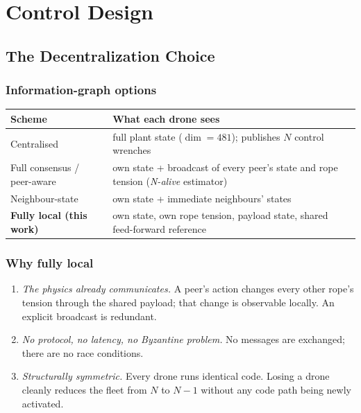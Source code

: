 \documentclass[11pt,a4paper,oneside]{report}
\begin{document}
\part{Control Design}

\chapter{The Decentralization Choice}
\label{chap:choice}

\section{Information-graph options}

\begin{longtable}{p{} p{}}
\toprule
\textbf{Scheme} & \textbf{What each drone sees} \\
\midrule
Centralised & full plant state ($\dim=481$); publishes $N$ control
wrenches \\
Full consensus / peer-aware & own state + broadcast of every peer's
state and rope tension (\emph{N-alive} estimator) \\
Neighbour-state & own state + immediate neighbours' states \\
\textbf{Fully local (this work)} & own state, own rope tension,
payload state, shared feed-forward reference \\
\bottomrule
\end{longtable}

\section{Why fully local}

\begin{enumerate}
\item \emph{The physics already communicates.} A peer's action
changes every other rope's tension through the shared payload; that
change is observable locally. An explicit broadcast is redundant.
\item \emph{No protocol, no latency, no Byzantine problem.} No
messages are exchanged; there are no race conditions.
\item \emph{Structurally symmetric.} Every drone runs identical
code. Losing a drone cleanly reduces the fleet from $N$ to $N-1$
without any code path being newly activated.
\end{enumerate}
\end{document}
